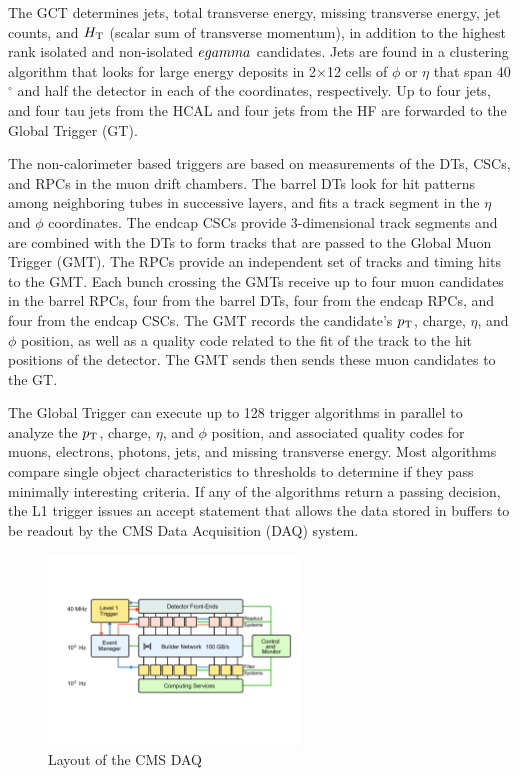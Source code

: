 \par The GCT determines jets, total transverse energy, missing
transverse energy, jet counts, and $H_{\mathrm{T}}$ (scalar sum of transverse
momentum), in addition to the highest rank isolated and non-isolated
$e\/gamma$ candidates.  Jets are found in a clustering algorithm that
looks for large energy deposits in 2$\times$12 cells of $\phi$ or
$\eta$ that span 40$^{\circ}$ and half the detector in each of the
coordinates, respectively.  Up to four jets, and four tau jets from the HCAL and
four jets from the HF are forwarded to the Global Trigger (GT).  

 \par The non-calorimeter based triggers are based on measurements of
 the DTs, CSCs, and RPCs in the muon drift chambers.  The barrel DTs
 look for hit patterns among neighboring tubes in successive layers,
 and fits a track segment in the $\eta$ and $\phi$ coordinates.  The
 endcap CSCs provide 3-dimensional track segments and are combined
 with the DTs to form tracks that are passed to the Global Muon
 Trigger (GMT).  The RPCs provide an independent set of tracks and
 timing hits to the GMT.  Each bunch crossing the GMTs receive up to
 four muon candidates in the barrel RPCs, four from the barrel DTs,
 four from the endcap RPCs, and four from the endcap CSCs.  The GMT
 records the candidate's $p_{\mathrm{T}}$, charge, $\eta$, and $\phi$ position,
 as well as a quality code related to the fit of the track to the hit
 positions of the detector.  The GMT sends then sends these muon
 candidates to the GT.  

\par The Global Trigger can execute up to 128 trigger algorithms in
parallel to analyze the $p_{\mathrm{T}}$, charge, $\eta$, and $\phi$ position,
and associated quality codes for muons, electrons, photons, jets, and
missing transverse energy.  Most algorithms compare single object
characteristics to thresholds to determine if they pass minimally
interesting criteria.  If any of the algorithms return a passing
decision, the L1 trigger issues an accept statement that allows the
data stored in buffers to be readout by the CMS Data Acquisition (DAQ)
system.  

\begin{figure}[h]
   \centering
  \includegraphics[width=0.6\textwidth]{Figures/CMS_Diagrams/Trigger__DAQ_layout.pdf}
  \caption{Layout of the CMS DAQ
    \cite{CMS:CMS_Machine_Chatrchyan:2008aa}} \label{fig:tigger_daq} 
\end{figure}


